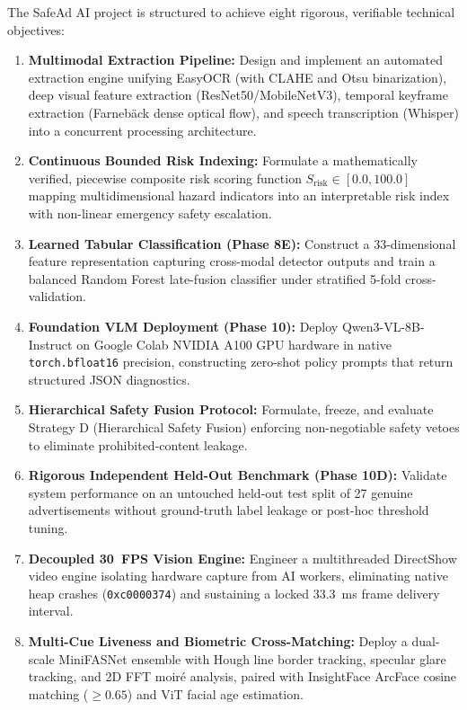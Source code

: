 \documentclass[12pt,a4paper]{report}
\begin{document}
The SafeAd AI project is structured to achieve eight rigorous, verifiable technical objectives:
\begin{enumerate}
    \item \textbf{Multimodal Extraction Pipeline:} Design and implement an automated extraction engine unifying EasyOCR (with CLAHE and Otsu binarization), deep visual feature extraction (ResNet50/MobileNetV3), temporal keyframe extraction (Farneb\"{a}ck dense optical flow), and speech transcription (Whisper) into a concurrent processing architecture.
    \item \textbf{Continuous Bounded Risk Indexing:} Formulate a mathematically verified, piecewise composite risk scoring function $S_{\text{risk}} \in [0.0, 100.0]$ mapping multidimensional hazard indicators into an interpretable risk index with non-linear emergency safety escalation.
    \item \textbf{Learned Tabular Classification (Phase 8E):} Construct a 33-dimensional feature representation capturing cross-modal detector outputs and train a balanced Random Forest late-fusion classifier under stratified 5-fold cross-validation.
    \item \textbf{Foundation VLM Deployment (Phase 10):} Deploy Qwen3-VL-8B-Instruct on Google Colab NVIDIA A100 GPU hardware in native \texttt{torch.bfloat16} precision, constructing zero-shot policy prompts that return structured JSON diagnostics.
    \item \textbf{Hierarchical Safety Fusion Protocol:} Formulate, freeze, and evaluate Strategy D (Hierarchical Safety Fusion) enforcing non-negotiable safety vetoes to eliminate prohibited-content leakage.
    \item \textbf{Rigorous Independent Held-Out Benchmark (Phase 10D):} Validate system performance on an untouched held-out test split of 27 genuine advertisements without ground-truth label leakage or post-hoc threshold tuning.
    \item \textbf{Decoupled 30~FPS Vision Engine:} Engineer a multithreaded DirectShow video engine isolating hardware capture from AI workers, eliminating native heap crashes (\texttt{0xc0000374}) and sustaining a locked 33.3~ms frame delivery interval.
    \item \textbf{Multi-Cue Liveness and Biometric Cross-Matching:} Deploy a dual-scale MiniFASNet ensemble with Hough line border tracking, specular glare tracking, and 2D FFT moir\'{e} analysis, paired with InsightFace ArcFace cosine matching ($\ge 0.65$) and ViT facial age estimation.
\end{enumerate}
\end{document}
